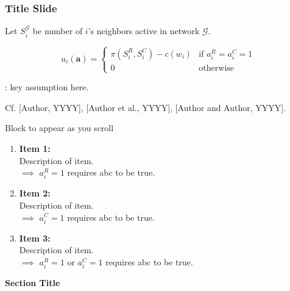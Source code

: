\documentclass[xcolor=dvipsnames,10pt]{beamer}
\begin{document}
\begin{frame}[c]\frametitle{Title Slide}
	Let $S_i^{\mathcal{G}}$ be number of $i$'s neighbors active in  network $\mathcal{G}$.
	

	  	\begin{equation}
	  		 u_i(\boldsymbol{a}) =
	  		  \begin{cases} 
	  		  	\pi(S_{i}^R,S_{i}^C) - c(w_i) & \text{if } a_i^R = a_i^C =1 \\
				0 & \text{otherwise} 
			\end{cases}
		\end{equation}
	

	
	: key assumption here.
	
	{\footnotesize Cf. [Author, YYYY], [Author et al., YYYY], [Author and Author, YYYY].}    \pause
	
	
	\begin{block}{Block to appear as you scroll}
		\begin{enumerate}
			\item \textbf{Item 1:} \\ Description of item. \\ $\implies$ $a_i^R=1$ requires abc to be true. \pause \footnotemark[1]
			\item \textbf{Item 2:} \\ Description of item.  \\ $\implies$ $a_i^C=1$ requires abc to be true.\footnotemark[2] \pause
			\item \textbf{Item 3:}\\ Description of item. \\ $\implies$ $a_i^R=1$ or $a_i^C=1$  requires abc to be true. \footnotemark[2]
		\end{enumerate}
	\end{block}
	
	
\end{frame}


\begin{frame}
	\thispagestyle{empty}
	\begin{center}
		{\bf {\Large Section Title}}
	\end{center}
\end{frame}
\end{document}

